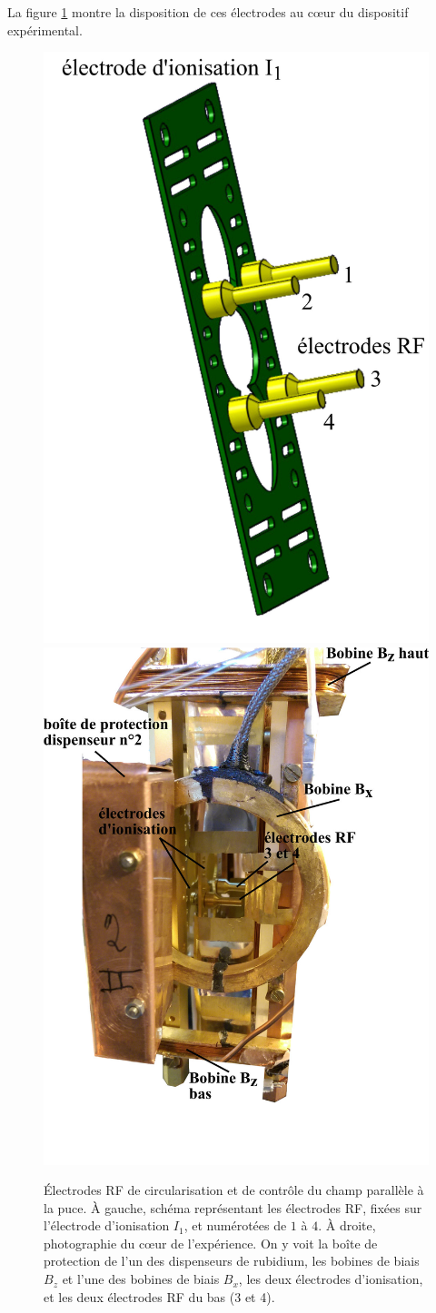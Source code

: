 La figure \ref{fig:RF_ELECTRODES} montre la disposition de ces électrodes au c\oe ur du dispositif expérimental.
%
\begin{figure}[!h]
\centering
\includegraphics[width=.4\linewidth]{figures/setup/rydberg/electrodes_RF_3D_labeled.jpg}
\includegraphics[width=.4\linewidth]{figures/setup/rydberg/electrodes_RF_photo}
\caption[Électrodes de circularisation et de contrôle du champ parallèle]{
Électrodes \og RF \fg{} de circularisation et de contrôle du champ parallèle à la puce.
\`A gauche, schéma représentant les électrodes RF, fixées sur l'électrode d'ionisation $I_1$, et numérotées de $1$ à $4$.
\`A droite, photographie du c\oe ur de l'expérience.
On y voit la \og boîte \fg{} de protection de l'un des dispenseurs de rubidium, les bobines de biais $B_z$ et l'une des bobines de biais $B_x$, les deux électrodes d'ionisation, et les deux électrodes RF du bas (3 et 4).
}
\label{fig:RF_ELECTRODES}
\end{figure}
%

